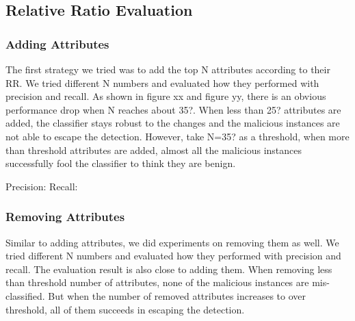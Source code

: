 \documentclass[11pt]{article}
\begin{document}

\subsection{Relative Ratio Evaluation}
\subsubsection{Adding Attributes}
The first strategy we tried was to add the top N attributes according to their RR. We tried different N numbers and evaluated how they performed with precision and recall. As shown in figure xx and figure yy, there is an obvious performance drop when N reaches about 35?. When less than 25? attributes are added, the classifier stays robust to the changes and the malicious instances are not able to escape the detection. However, take N=35? as a threshold, when more than threshold attributes are added, almost all the malicious instances successfully fool the classifier to think they are benign.

Precision: Recall: 

\subsubsection{Removing Attributes}
Similar to adding attributes, we did experiments on removing them as well. We tried different N numbers and evaluated how they performed with precision and recall. The evaluation result is also close to adding them. When removing less than threshold number of attributes, none of the malicious instances are mis-classified. But when the number of removed attributes increases to over threshold, all of them succeeds in escaping the detection.
\end{document}
